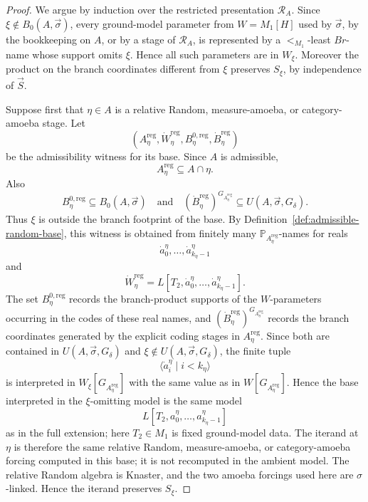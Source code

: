 \documentclass[a4paper,11pt]{article}
\begin{document}
\begin{proof}
We argue by induction over the restricted presentation \(\mathcal R_A\).  Since
\(\xi\notin B_0(A,\vec\sigma)\), every ground-model parameter from
\(W=M_1[H]\) used by \(\vec\sigma\), by the bookkeeping on \(A\), or by a
stage of \(\mathcal R_A\), is represented by a \(<_{M_1}\)-least \(Br\)-name whose
support omits \(\xi\).  Hence all such parameters are in \(W_\xi\).
Moreover the product on the branch coordinates different from \(\xi\) preserves
\(S_\xi\), by independence of \(\vec S\).

Suppose first that \(\eta\in A\) is a relative Random, measure-amoeba, or
category-amoeba stage.  Let
\[
   (A^{\mathrm{reg}}_\eta,
    \dot W^{\mathrm{reg}}_\eta,
    B^{0,\mathrm{reg}}_\eta,
    \dot B^{\mathrm{reg}}_\eta)
\]
be the admissibility witness for its base.  Since \(A\) is admissible,
\[
   A^{\mathrm{reg}}_\eta\subseteq A\cap\eta.
\]
Also
\[
   B^{0,\mathrm{reg}}_\eta\subseteq B_0(A,\vec\sigma)
   \quad\text{and}\quad
   (\dot B^{\mathrm{reg}}_\eta)^{G_{A^{\mathrm{reg}}_\eta}}
      \subseteq U(A,\vec\sigma,G_\delta).
\]
Thus \(\xi\) is outside the branch footprint of the base.  By
Definition~\ref{def:admissible-random-base}, this witness is obtained from
finitely many \(\mathbb P_{A^{\mathrm{reg}}_\eta}\)-names for reals
\[
   \dot a^\eta_0,\ldots,\dot a^\eta_{k_\eta-1}
\]
and
\[
   \dot W^{\mathrm{reg}}_\eta
   =L[T_2,\dot a^\eta_0,\ldots,\dot a^\eta_{k_\eta-1}].
\]
The set \(B^{0,\mathrm{reg}}_\eta\) records the branch-product supports of the
\(W\)-parameters occurring in the codes of these real names, and
\((\dot B^{\mathrm{reg}}_\eta)^{G_{A^{\mathrm{reg}}_\eta}}\) records the branch
coordinates generated by the explicit coding stages in
\(A^{\mathrm{reg}}_\eta\).  Since both are contained in
\(U(A,\vec\sigma,G_\delta)\) and \(\xi\notin U(A,\vec\sigma,G_\delta)\), the
finite tuple
\[
   \langle \dot a^\eta_i\mid i<k_\eta\rangle
\]
is interpreted in \(W_\xi[G_{A^{\mathrm{reg}}_\eta}]\) with the same value as
in \(W[G_{A^{\mathrm{reg}}_\eta}]\).  Hence the base interpreted in the
\(\xi\)-omitting model is the same model
\[
   L[T_2,a^\eta_0,\ldots,a^\eta_{k_\eta-1}]
\]
as in the full extension; here \(T_2\in M_1\) is fixed ground-model data.  The
iterand at \(\eta\) is therefore the same relative Random, measure-amoeba, or
category-amoeba forcing computed in this base; it is not recomputed in the
ambient model.  The relative Random algebra is Knaster, and the two amoeba
forcings used here are \(\sigma\)-linked.  Hence the iterand preserves
\(S_\xi\).


\end{proof}
\end{document}
